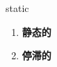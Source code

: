 
\begin{frame}
{\huge static}
\begin{center}
\begin{enumerate}\Large
  \item \textbf{静态的}
  \item \textbf{停滞的}
\end{enumerate}
\end{center}
\end{frame}
